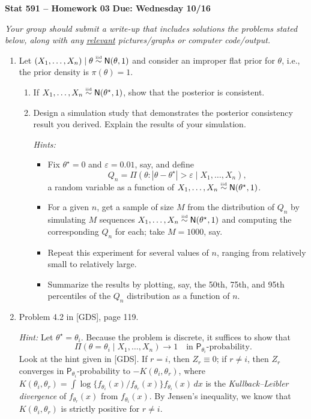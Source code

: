 \documentclass[a4paper,12pt]{article}
\newcommand{\prob}{\mathsf{P}}
\newcommand{\eps}{\varepsilon}
\newcommand{\iid}{\overset{\text{\tiny iid}}{\sim}}
\newcommand{\nm}{\mathsf{N}}
\begin{document}
\noindent \large \textbf{Stat 591 -- Homework 03} \hfill \textbf{Due: Wednesday 10/16} \normalsize

\medskip

\noindent \emph{Your group should submit a write-up that includes solutions the problems stated below, along with any \underline{relevant} pictures/graphs or computer code/output.}  

\medskip

\begin{enumerate}

\item Let $(X_1,\ldots,X_n) \mid \theta \iid \nm(\theta, 1)$ and consider an improper flat prior for $\theta$, i.e., the prior density is $\pi(\theta) = 1$.  
\begin{enumerate}
\item If $X_1,\ldots,X_n \iid \nm(\theta^\star, 1)$, show that the posterior is consistent.  
\item Design a simulation study that demonstrates the posterior consistency result you derived.  Explain the results of your simulation.  

\emph{Hints:}
\begin{itemize}
\item Fix $\theta^\star=0$ and $\eps=0.01$, say, and define 
\[ Q_n = \Pi(\theta: |\theta-\theta^\star| > \eps \mid X_1,\ldots,X_n), \]
a random variable as a function of $X_1,\ldots,X_n \iid \nm(\theta^\star, 1)$. 
\item For a given $n$, get a sample of size $M$ from the distribution of $Q_n$ by simulating $M$ sequences $X_1,\ldots,X_n \iid \nm(\theta^\star, 1)$ and computing the corresponding $Q_n$ for each; take $M=1000$, say.  
\item Repeat this experiment for several values of $n$, ranging from relatively small to relatively large.  
\item Summarize the results by plotting, say, the 50th, 75th, and 95th percentiles of the $Q_n$ distribution as a function of $n$.  
\end{itemize}
\end{enumerate}

\item Problem 4.2 in [GDS], page 119.

\emph{Hint:} Let $\theta^\star=\theta_i$.  Because the problem is discrete, it suffices to show that 
\[ \Pi(\theta=\theta_i \mid X_1,\ldots,X_n) \to 1 \quad \text{in $\prob_{\theta_i}$-probability}. \]
Look at the hint given in [GDS].  If $r=i$, then $Z_r \equiv 0$; if $r \neq i$, then $Z_r$ converges in $\prob_{\theta_i}$-probability to $-K(\theta_i, \theta_r)$, where $K(\theta_i,\theta_r) = \int \log\{ f_{\theta_i}(x) / f_{\theta_r}(x)\} f_{\theta_i}(x) \,dx$ is the \emph{Kullback--Leibler divergence} of $f_{\theta_r}(x)$ from $f_{\theta_i}(x)$.  By Jensen's inequality, we know that $K(\theta_i, \theta_r)$ is strictly positive for $r \neq i$.  


\end{enumerate}
\end{document}
